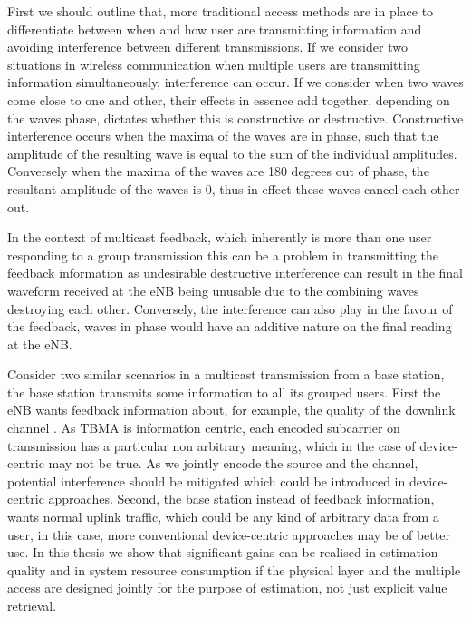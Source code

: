 \documentclass{article}
\begin{document}
First we should outline that, more traditional access methods are in place to differentiate between when and how user are transmitting information and avoiding interference between different transmissions. If we consider two situations in wireless communication when multiple users are transmitting information simultaneously, interference can occur. If we consider when two waves come close to one and other, their effects in essence add together, depending on the waves phase, dictates whether this is constructive or destructive. Constructive interference occurs when the maxima of the waves are in phase, such that the amplitude of the resulting wave is equal to the sum of the individual amplitudes. Conversely when the maxima of the waves are 180 degrees out of phase, the resultant amplitude of the waves is 0, thus in effect these waves cancel each other out. 

In the context of multicast feedback, which inherently is more than one user responding to a group transmission this can be a problem in transmitting the feedback information as undesirable destructive interference can result in the final waveform received at the eNB being unusable due to the combining waves destroying each other. Conversely, the interference can also play in the favour of the feedback, waves in phase would have an additive nature on the final reading at the eNB. 




Consider two similar scenarios in a multicast transmission from a base station, the base station transmits some information to all its grouped users. First the eNB wants feedback information about, for example, the quality of the downlink channel . As TBMA is information centric, each encoded subcarrier on transmission has a particular non arbitrary meaning, which in the case of device-centric may not be true. As we jointly encode the source and the channel, potential interference should be mitigated which could be introduced in device-centric approaches. Second, the base station instead of feedback information, wants normal uplink traffic, which could be any kind of arbitrary data from a user, in this case, more conventional device-centric approaches may be of better use. In this thesis we show that significant gains can be realised in estimation quality and in system resource consumption if the physical layer and the multiple access are designed jointly for the purpose of estimation, not just explicit value retrieval.
\end{document}
